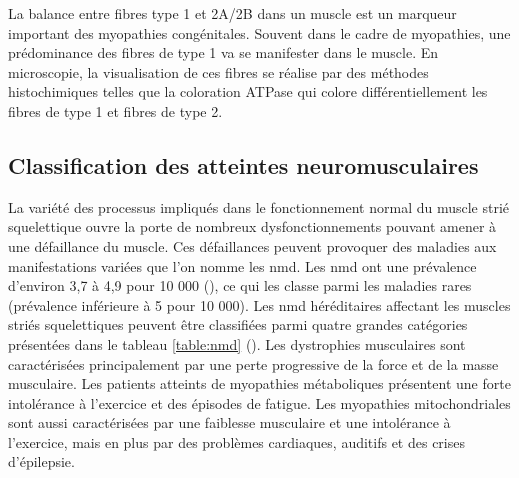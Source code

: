 La balance entre fibres type 1 et 2A/2B dans un muscle est un marqueur important des myopathies congénitales. Souvent dans le cadre de myopathies, une prédominance des fibres de type 1 va se manifester dans le muscle. En microscopie, la visualisation de ces fibres se réalise par des méthodes histochimiques telles que la coloration ATPase qui colore différentiellement les fibres de type 1 et fibres de type 2. 

\subsection{Classification des atteintes neuromusculaires}
La variété des processus impliqués dans le fonctionnement normal du muscle strié squelettique ouvre la porte de nombreux dysfonctionnements pouvant amener à une défaillance du muscle. Ces défaillances peuvent provoquer des maladies aux manifestations variées que l'on nomme les \gls{nmd}. Les \gls{nmd} ont une prévalence d'environ 3,7 à 4,9 pour 10 000 (\cite{lace_overview_2022}), ce qui les classe parmi les maladies rares (prévalence inférieure à 5 pour 10 000). Les \gls{nmd} héréditaires affectant les muscles striés squelettiques peuvent être classifiées parmi quatre grandes catégories présentées dans le tableau \ref{table:nmd} (\cite{lornage_identification_2019, benarroch_2023_2023}). Les dystrophies musculaires sont caractérisées principalement par une perte progressive de la force et de la masse musculaire. Les patients atteints de myopathies métaboliques présentent une forte intolérance à l'exercice et des épisodes de fatigue. Les myopathies mitochondriales sont aussi caractérisées par une faiblesse musculaire et une intolérance à l'exercice, mais en plus par des problèmes cardiaques, auditifs et des crises d'épilepsie.

